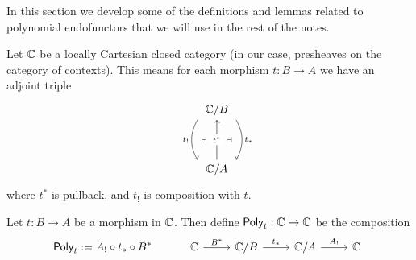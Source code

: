 In this section we develop some of the definitions
and lemmas related to polynomial endofunctors that we will use
in the rest of the notes.

\begin{defn}
  Let $\mathbb{C}$ be a locally Cartesian closed category
  (in our case, presheaves on the category of contexts).
  This means for each morphism $t : B \to A$ we have an adjoint triple
  \[\begin{tikzcd}
    & {\catC / B} \\
    \\
    {} & {\catC / A}
    \arrow[""{name=0, anchor=center, inner sep=0}, "{t_*}", bend left, shift left=5, from=1-2, to=3-2]
    \arrow[""{name=1, anchor=center, inner sep=0}, "{t_!}"', bend right, shift right=5, from=1-2, to=3-2]
    \arrow[""{name=2, anchor=center, inner sep=0}, "{t^*}"{description}, from=3-2, to=1-2]
    \arrow["\dashv"{anchor=center}, draw=none, from=1, to=2]
    \arrow["\dashv"{anchor=center}, draw=none, from=2, to=0]
  \end{tikzcd}\]
  where $t^{*}$ is pullback, and $t_{!}$ is composition with $t$.

  Let $t : B \to A$ be a morphism in $\mathbb{C}$.
  Then define $\mathsf{Poly}_{t} : \mathbb{C} \to \mathbb{C}$ be the composition
  \[
    \Poly{t} := A_{!} \circ t_{*} \circ B^{*}
    \quad \quad \quad
    \begin{tikzcd}
    \catC & {\catC / B} & {\catC / A} & \catC
    \arrow["{B^*}", from=1-1, to=1-2]
    \arrow["{t_*}", from=1-2, to=1-3]
    \arrow["{A_!}", from=1-3, to=1-4]
  \end{tikzcd}\]
\end{defn}

\medskip


